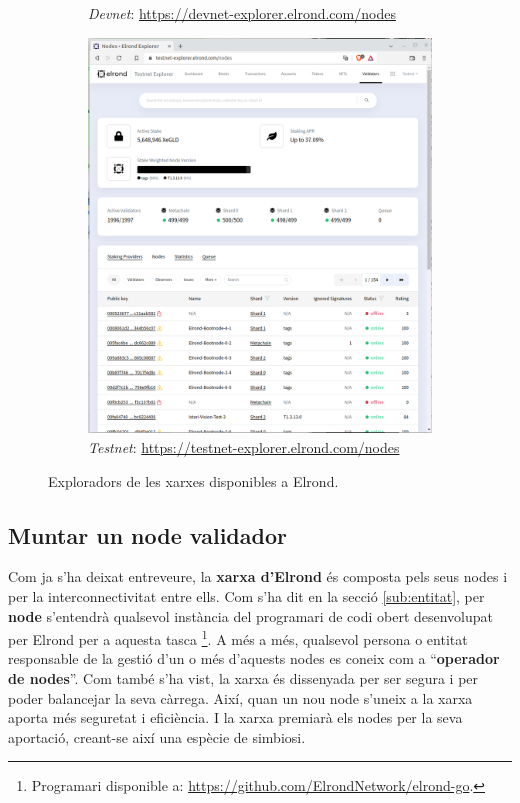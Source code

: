 \documentclass[11pt,a4paper]{article}
\begin{document}
\begin{figure}[!htb]
\begin{subfigure}[b]{0.32\textwidth}
  \caption{\textit{Devnet}: \scriptsize\url{https://devnet-explorer.elrond.com/nodes}}\label{fig:devnet}
\end{subfigure}\hfill
\begin{subfigure}[b]{0.32\textwidth}
  \includegraphics[width=\linewidth]{testnet.png}
  \caption{\textit{Testnet}: \scriptsize\url{https://testnet-explorer.elrond.com/nodes}}\label{fig:testnet}
\end{subfigure}\hfill
\caption{Exploradors de les xarxes disponibles a Elrond.}\label{fig:nets}
\end{figure}

\subsection{Muntar un node validador}
Com ja s'ha deixat entreveure, la \textbf{xarxa d'Elrond} és composta pels seus nodes i per la interconnectivitat entre ells. Com s'ha dit en la secció \ref{sub:entitat}, per \textbf{node} s'entendrà qualsevol instància del programari de codi obert desenvolupat per Elrond per a aquesta tasca \footnote{Programari disponible a: \url{https://github.com/ElrondNetwork/elrond-go}.}. A més a més, qualsevol persona o entitat responsable de la gestió d'un o més d'aquests nodes es coneix com a ``\textbf{operador de nodes}''. Com també s'ha vist, la xarxa és dissenyada per ser segura i per poder balancejar la seva càrrega. Així, quan un nou node s'uneix a la xarxa aporta més seguretat i eficiència. I la xarxa premiarà els nodes per la seva aportació, creant-se així una espècie de simbiosi.
\end{document}
